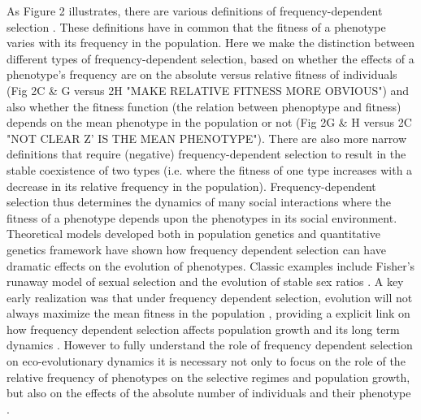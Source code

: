 \documentclass{article}
\begin{document}
 As Figure 2 illustrates, there are various definitions of frequency-dependent selection \citep{Heino1998}. These definitions have in common that the fitness of a phenotype varies with its frequency in the population. Here we make the distinction between different types of frequency-dependent selection, based on whether the effects of a phenotype's frequency are on the absolute versus relative fitness  of individuals (Fig 2C \& G versus 2H "MAKE RELATIVE FITNESS MORE OBVIOUS") and also whether the fitness function (the relation between phenoptype and fitness) depends on the mean phenotype in the population or not (Fig 2G \& H versus 2C "NOT CLEAR Z' IS THE MEAN PHENOTYPE"). There are also more narrow definitions that require (negative) frequency-dependent selection to result in the stable coexistence of two types (i.e. where the fitness of one type increases with a decrease in its relative frequency in the population). Frequency-dependent selection thus determines the dynamics of many social interactions where the fitness of a phenotype depends upon the phenotypes in its social environment. Theoretical models developed both in population genetics \citep{Wright1969} and quantitative genetics \citep{Lande2007, Engen2020} framework have shown how frequency dependent selection can have dramatic effects on the evolution of phenotypes. Classic examples include Fisher's runaway model of sexual selection and the evolution of stable sex ratios \citep{Fisher1930}. A key early realization was that under frequency dependent selection, evolution will not always maximize the mean fitness in the population \citep{Wright1969}, providing a explicit link on how frequency dependent selection affects population growth and its long term dynamics \citep{Svensson2018}. However to fully understand the role of frequency dependent selection on eco-evolutionary dynamics it is necessary not only to focus on the role of the relative frequency of phenotypes on the selective regimes and population growth, but also on the effects of the absolute number of individuals and their phenotype \citep{Anderson1971, Matessi1976, Asmussen1983, Heino1998, Joshi2001, Engen2020}. 
 
\end{document}
